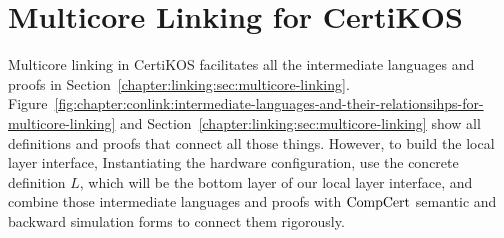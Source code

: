 \section{Multicore Linking for CertiKOS}
\label{chapter:certikos:sec:multicore-linking-for-certikos}

Multicore linking in CertiKOS facilitates all the intermediate languages
and proofs in Section~\ref{chapter:linking:sec:multicore-linking}.
Figure~\ref{fig:chapter:conlink:intermediate-languages-and-their-relationsihps-for-multicore-linking} and 
Section~\ref{chapter:linking:sec:multicore-linking} show all definitions and 
proofs that connect all those things. 
However, to build the local layer interface, 
Instantiating the hardware configuration, 
use the concrete definition $L$, which will be the 
bottom layer of our local layer interface, 
and combine those intermediate languages and proofs with $\mathrm{CompCert}$ semantic and backward simulation 
forms to connect them rigorously. 

%
%
%

